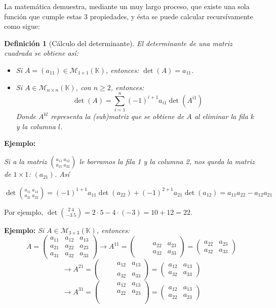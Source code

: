 \documentclass[12pt]{book}
\newtheorem{defi}{Definici\'on}
\def\K{\mathbb{K}}
\begin{document}
La matemática demuestra, mediante un muy largo proceso, que existe una sola función que cumple estas 3 propiedades, y ésta se puede calcular recursívamente como sigue:

\begin{defi}[Cálculo del determinante]
  El determinante de una matriz cuadrada se obtiene así:
\begin{itemize}
\item Si $A=(a_{11})\in\mathcal{M}_{1\times 1}(\K)$, entonces: $\det(A)=a_{11}$.
\item Si $A\in\mathcal{M}_{n\times n}(\K)$, con $n\ge 2$, entonces:
  $$\det(A)=\sum_{i=1}^n(-1)^{i+1}a_{i1}\det(A^{i1})$$
  Donde $A^{kl}$ representa la (sub)matriz que se obtiene de $A$ al eliminar la fila $k$ y la columna $l$.
\end{itemize}
\end{defi}

 

{\bf Ejemplo:} {\em Si a la matriz ${ a_{11}\ a_{12}\choose a_{21}\ a_{22} }$ le borramos la fila 1 y la columna 2, nos queda la matriz de $1\times 1$: $(a_{21})$. Así

  $\det{ a_{11}\ a_{12}\choose a_{21}\ a_{22} }=(-1)^{1+1}a_{11}\det(a_{22})+(-1)^{2+1}a_{21}\det(a_{12})=a_{11}a_{22}-a_{12}a_{21}$

Por ejemplo, $\det{2\ 4\choose -3\ 5}=2\cdot 5-4\cdot(-3)=10+12=22$.}

{\bf Ejemplo:} {\em Si $A\in\mathcal{M}_{3\times 3}(\K)$, entonces:
  $$A=\left(\begin{array}{ccc}a_{11}&a_{12}&a_{13}\\a_{21}&a_{22}&a_{23}\\a_{31}&a_{32}&a_{33}\end{array}\right) \longrightarrow
  A^{11}=\left(\begin{array}{ccc}&&\\\phantom{a_{21}}&a_{22}&a_{23}\\&a_{32}&a_{33}\end{array}\right)=\left(\begin{array}{cc}a_{22}&a_{23}\\a_{32}&a_{33}\end{array}\right)$$
  $$\longrightarrow A^{21}=\left(\begin{array}{ccc}\phantom{a_{11}}& a_{12}& a_{13}
    \\&&\\&a_{32}&a_{33}\end{array}\right)=\left(\begin{array}{cc}a_{12}&a_{13}\\a_{32}&a_{33}\end{array}\right)$$
  $$\longrightarrow A^{31}=\left(\begin{array}{ccc}&a_{12}&a_{13}\\
    \phantom{a_{21}}&a_{22}&{a_{23}}\\
    \phantom{a_{31}}&&\end{array}\right)=
  \left(\begin{array}{cc}a_{12}&a_{13}\\a_{22}&a_{23}\end{array}\right)$$
}
\end{document}
